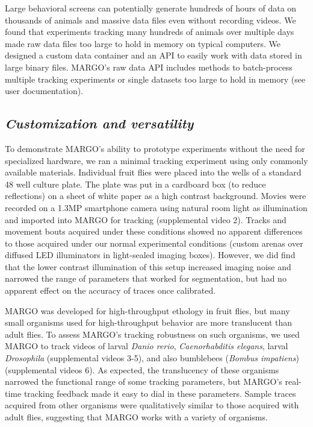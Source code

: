 \documentclass[10pt,letterpaper]{article}
\begin{document}
Large behavioral screens can potentially generate hundreds of hours of data on thousands of animals and massive data files even without recording videos. We found that experiments tracking many hundreds of animals over multiple days made raw data files too large to hold in memory on typical computers. We designed a custom data container and an API to easily work with data stored in large binary files. MARGO's raw data API includes methods to batch-process multiple tracking experiments or single datasets too large to hold in memory (see user documentation). 

\subsection*{\textit{Customization and versatility}}

To demonstrate MARGO's ability to prototype experiments without the need for specialized hardware, we ran a minimal tracking experiment using only commonly available materials. Individual fruit flies were placed into the wells of a standard 48 well culture plate. The plate was put in a cardboard box (to reduce reflections) on a sheet of white paper as a high contrast background. Movies were recorded on a 1.3MP smartphone camera using natural room light as illumination and imported into MARGO for tracking (supplemental video 2). Tracks and movement bouts acquired under these conditions showed no apparent differences to those acquired under our normal experimental conditions (custom arenas over diffused LED illuminators in light-sealed imaging boxes). However, we did find that the lower contrast illumination of this setup increased imaging noise and narrowed the range of parameters that worked for segmentation, but had no apparent effect on the accuracy of traces once calibrated.

MARGO was developed for high-throughput ethology in fruit flies, but many small organisms used for high-throughput behavior are more translucent than adult flies. To assess MARGO’s tracking robustness on such organisms, we used MARGO to track videos of larval \emph{Danio rerio}, \emph{Caenorhabditis elegans}, larval \emph{Drosophila} (supplemental videos 3-5), and also bumblebees (\emph{Bombus impatiens}) (supplemental videos 6). As expected, the translucency of these organisms narrowed the functional range of some tracking parameters, but MARGO's real-time tracking feedback made it easy to dial in these parameters. Sample traces acquired from other organisms were qualitatively similar to those acquired with adult flies, suggesting that MARGO works with a variety of organisms.
\end{document}
